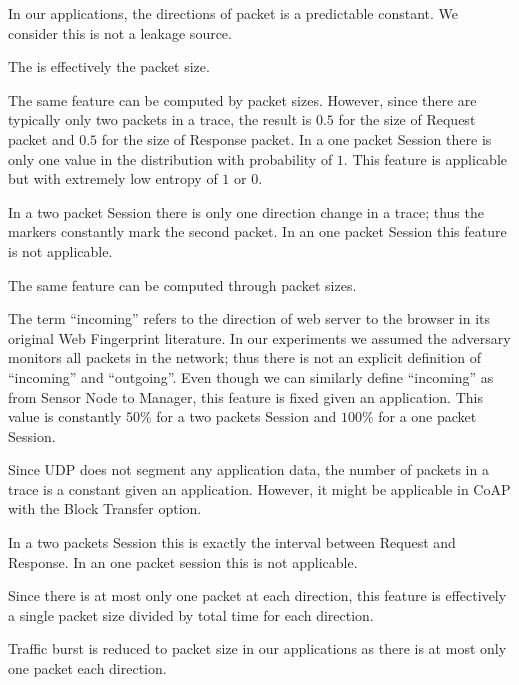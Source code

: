 \begin{description}[style=nextline]
	\item[Direction]
	In our applications, the directions of packet is a predictable constant. We consider this is not a leakage source.
	
	\item[Length]
	The is effectively the packet size.
	
	\item[Frequency Distribution of Length]
	The same feature can be computed by packet sizes. However, since there are typically only two packets in a trace, the result is $0.5$ for the size of Request packet and $0.5$ for the size of Response packet. In a one packet Session there is only one value in the distribution with probability of $1$. This feature is applicable but with extremely low entropy of $1$ or $0$.
	
	\item[Size, HTML and Number Markers]
	In a two packet Session there is only one direction change in a trace; thus the markers constantly mark the second packet. In an one packet Session this feature is not applicable.
	
	\item[Total Bytes]
	The same feature can be computed through packet sizes.
	
	\item[Percentage Incoming Packets]
	The term ``incoming'' refers to the direction of web server to the browser in its original Web Fingerprint literature. In our experiments we assumed the adversary monitors all packets in the network; thus there is not an explicit definition of ``incoming'' and ``outgoing''. Even though we can similarly define ``incoming'' as from Sensor Node to Manager, this feature is fixed given an application. This value is constantly $50\%$ for a two packets Session and $100\%$ for a one packet Session.
	
	\item[Number of Packets]
	Since UDP does not segment any application data, the number of packets in a trace is a constant given an application. However, it might be applicable in CoAP with the Block Transfer option.
	
	\item[Total Time]
	In a two packets Session this is exactly the interval between Request and Response. In an one packet session this is not applicable.
	
	\item[Total Per-direction Bandwidth]
	Since there is at most only one packet at each direction, this feature is effectively a single packet size divided by total time for each direction.
	
	\item[Traffic Burst]
	Traffic burst is reduced to packet size in our applications as there is at most only one packet each direction.
\end{description}

